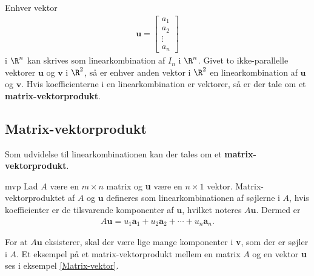 %
%
Enhver vektor 
\begin{align*}
\textbf{u}=
\begin{bmatrix}
a_1 \\
a_2 \\
\vdots \\
a_n
\end{bmatrix}
\end{align*}
%
i $\R^n$ kan skrives som linearkombination af $I_n$ i $\R^n$. 
Givet to ikke-parallelle vektorer $\mathbf{u}$ og $\mathbf{v}$ i $\R^2$, så er enhver anden vektor i $\R^2$ en linearkombination af $\mathbf{u}$ og $\mathbf{v}$. 
Hvis koefficienterne i en linearkombination er vektorer, så er der tale om et \textbf{matrix-vektorprodukt}.
%
%
%
%
\subsection{Matrix-vektorprodukt}
%
Som udvidelse til linearkombinationen kan der tales om et \textbf{matrix-vektorprodukt}.
%
%
\begin{defn}{}{mvp}
Lad $A$ være en $m \times n$ matrix og \textbf{u} være en $n \times 1$ vektor. 
Matrix-vektorproduktet af $A$ og $\textbf{u}$ defineres som linearkombinationen af søjlerne i $A$, hvis koefficienter er de tilsvarende komponenter af $\textbf{u}$, hvilket noteres $A\textbf{u}$. 
Dermed er
\begin{align*}
A\textbf{u} =u_1\textbf{a}_1 + u_2\textbf{a}_2 + \cdots + u_n\textbf{a}_n.
\end{align*}
\end{defn}
\noindent
For at $A\textbf{u}$ eksisterer, skal der være lige mange komponenter i \textbf{v}, som der er søjler i $A$. 
Et eksempel på et matrix-vektorprodukt mellem en matrix $A$ og en vektor \textbf{u} ses i eksempel \ref{Matrix-vektor}.
\\
%
